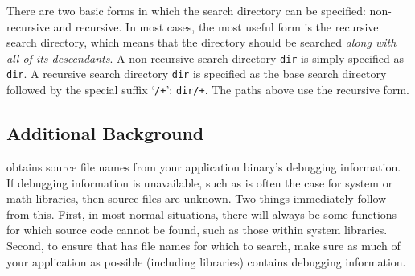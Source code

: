 \documentclass[11pt,letterpaper]{report}
\begin{document}
There are two basic forms in which the search directory can be specified: non-recursive and recursive.
In most cases, the most useful form is the recursive search directory, which means that the directory should be searched \emph{along with all of its descendants}.
A non-recursive search directory \texttt{dir} is simply specified as \texttt{dir}.
A recursive search directory \texttt{dir} is specified as the base search directory followed by the special suffix `\texttt{/+}': \texttt{dir/+}.
The paths above use the recursive form.



\subsection{Additional Background}

\hpcprofAll{} obtains source file names from your application binary's debugging information.
If debugging information is unavailable, such as is often the case for system or math libraries, then source files are unknown.
Two things immediately follow from this.
First, in most normal situations, there will always be some functions for which source code cannot be found, such as those within system libraries.
Second, to ensure that \hpcprofAll{} has file names for which to search, make sure as much of your application as possible (including libraries) contains debugging information.
\end{document}
